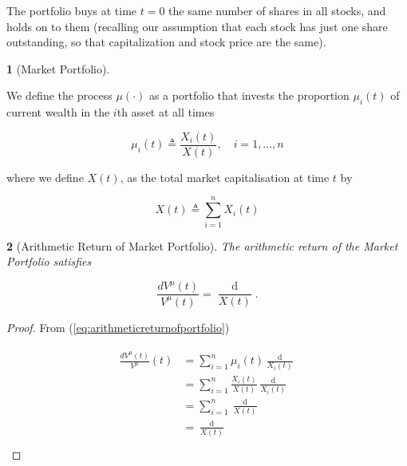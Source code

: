 \documentclass[british]{amsart} \usepackage{lmodern}
\numberwithin{equation}{section} \numberwithin{figure}{section}
\theoremstyle{plain} \newtheorem{thm}{\protect\theoremname}[section]
\theoremstyle{definition} \newtheorem{defn}[thm]{\protect\definitionname}
\theoremstyle{plain} \newtheorem{assumption}[thm]{\protect\assumptionname}
\theoremstyle{plain} \newtheorem{lem}[thm]{\protect\lemmaname}
\theoremstyle{plain} \newtheorem{prop}[thm]{\protect\propositionname}
\theoremstyle{remark} \newtheorem{rem}[thm]{\protect\remarkname}
\theoremstyle{plain} \newtheorem{cor}[thm]{\protect\corollaryname}
\renewcommand{\d}[1]{\mathop{\mathrm{d}{#1}}}
\newcommand{\defeq}{\mathop{\triangleq}} \newcommand{\almostsurely}{\text{a.s.}}
\newcommand{\rangei}{i=1,\dots,n} \newcommand{\measure}{\mathbb{P}}
\newcommand{\Vmu}{V^{\mu}}
\begin{document}
The portfolio buys at time $t=0$ the same number of shares in all stocks, and
holds on to them (recalling our assumption that each stock has just one share
outstanding, so that capitalization and stock price are the same).

\begin{defn} [Market Portfolio] 
  \label{def:marketportfolio}

  We define the process $\mu(\cdot)$ as a portfolio that invests the proportion
  $\mu_{i}(t)$ of current wealth in the $i$th asset at all times

  \begin{equation} 
    \label{eq:marketportfolio} 
      \mu_{i}(t) \defeq \frac{X_{i}(t)}{X(t)}, 
    \quad 
    \rangei 
  \end{equation}

  where we define $X(t)$, as the total market capitalisation at time $t$ by

  \begin{equation} 
    \label{eq:totalmarketcapitalisation} 
      X(t) \defeq \sum_{i=1}^{n} X_{i}(t) 
  \end{equation}

\end{defn}

\begin{prop} [Arithmetic Return of Market Portfolio]

  The arithmetic return of the Market Portfolio satisfies

  \begin{equation} 
    \label{eq:arithmeticreturnofmarketportfolio}
      \frac{d{\Vmu}(t)}{\Vmu(t)} = \frac{\d{X(t)}}{X(t)}.
  \end{equation}

\end{prop}


\begin{proof}

  From (\ref{eq:arithmeticreturnofportfolio})

  \begin{gather} 
    \begin{split} 
      \frac{d{\Vmu}(t)}{\Vmu}(t) 
      & =\sum_{i=1}^{n} \mu_{i}(t) \frac{\d{X_{i}(t)}}{X_{i}(t)} \\ 
      & = \sum_{i=1}^{n} \frac{X_{i}(t)}{X(t)} \frac{\d{X_{i}(t)}}{X_{i}(t)} \\ 
      & = \sum_{i=1}^{n} \frac{\d{X_{i}(t)}}{X(t)} \\ 
      & = \frac{\d{X(t)}}{X(t)} \\
    \end{split} 
  \end{gather}

\end{proof}
\end{document}
